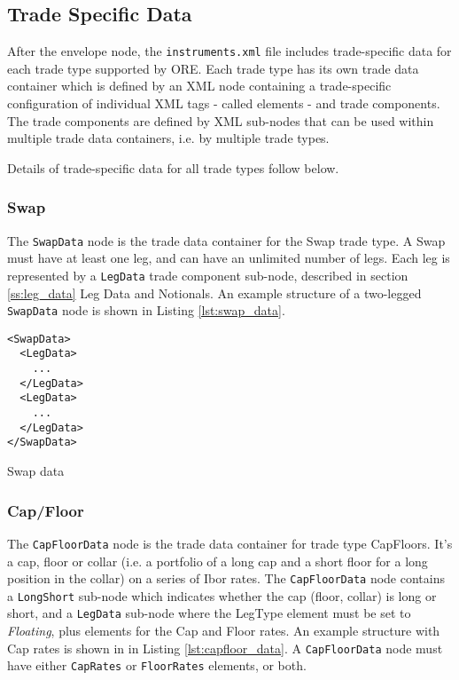 \subsection{Trade Specific Data}

After the envelope node, the {\tt instruments.xml} file includes trade-specific data for each trade type supported by
ORE. Each trade type has its own trade data container which is defined by an XML node containing a trade-specific
configuration of individual XML tags - called elements - and trade components. The trade components are defined by XML
sub-nodes that can be used within multiple trade data containers, i.e.  by multiple trade types.

\vspace{1em}

Details of  trade-specific data for all trade types follow below.

\subsubsection{Swap}

The \lstinline!SwapData! node is the trade data container for the Swap trade type. A Swap must have at least one leg,
and can have an unlimited number of legs. Each leg is represented by a \lstinline!LegData! trade component sub-node,
described in section \ref{ss:leg_data} Leg Data and Notionals. An example structure of a two-legged \lstinline!SwapData!
node is shown in Listing \ref{lst:swap_data}.

\begin{listing}[H]
\begin{verbatim}
<SwapData>
  <LegData>
    ...
  </LegData>
  <LegData>
    ...
  </LegData>
</SwapData>
\end{verbatim}
\caption{Swap data}
\label{lst:swap_data}
\end{listing}

\subsubsection{Cap/Floor}

The \lstinline!CapFloorData! node is the trade data container for trade type CapFloors.  It's a cap, floor or collar
(i.e. a portfolio of a long cap and a short floor for a long position in the collar) on a series of Ibor rates. The
\lstinline!CapFloorData! node contains a \lstinline!LongShort! sub-node which indicates whether the cap (floor, collar)
is long or short, and a \lstinline!LegData!  sub-node where the LegType element must be set to \emph{Floating}, plus
elements for the Cap and Floor rates. An example structure with Cap rates is shown in in Listing
\ref{lst:capfloor_data}. A \lstinline!CapFloorData! node must have either \lstinline!CapRates! or \lstinline!FloorRates!
elements, or both.

